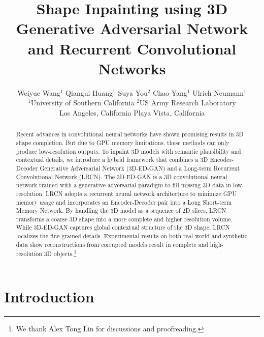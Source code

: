 \documentclass[10pt,twocolumn,letterpaper]{article}
\begin{document}
\title{Shape Inpainting using 3D Generative Adversarial Network and Recurrent Convolutional Networks}

\author{Weiyue Wang$^1$
 \qquad Qiangui Huang$^1$ \qquad Suya You$^2$ \qquad Chao Yang$^1$ \qquad Ulrich Neumann$^1$\\
$^1$University of Southern California \hspace{20mm} $^2$US Army Research Laboratory\\
\hspace{5mm}Los Angeles, California \hspace{35mm} Playa Vista, California\\
\hspace{20mm}{\tt\small suya.you.civ@mail.mil}\qquad
}

\maketitle


\begin{abstract}
Recent advances in convolutional neural networks have shown promising results in 3D shape completion. But due to GPU memory limitations, these methods can only produce low-resolution outputs. To inpaint 3D models with semantic plausibility and contextual details, we introduce a hybrid framework that combines a 3D Encoder-Decoder Generative Adversarial Network (3D-ED-GAN) and a Long-term Recurrent Convolutional Network (LRCN). The 3D-ED-GAN is a 3D convolutional neural network trained with a generative adversarial paradigm to fill missing 3D data in low-resolution. LRCN adopts a recurrent neural network architecture to minimize GPU memory usage and incorporates an Encoder-Decoder pair into a Long Short-term Memory Network. By handling the 3D model as a sequence of 2D slices, LRCN transforms a coarse 3D shape into a more complete and higher resolution volume. While 3D-ED-GAN captures global contextual structure of the 3D shape, LRCN localizes the fine-grained details. Experimental results on both real-world and synthetic data show reconstructions from corrupted models result in complete and high-resolution 3D objects.\let\thefootnote\relax\footnote{We thank Alex Tong Lin for discussions and proofreading.}
\end{abstract}

\section{Introduction}
\end{document}
